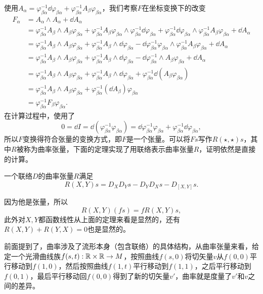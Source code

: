 使用$A_\alpha=\varphi_{\beta\alpha}^{-1}\dd\varphi_{\beta\alpha}+\varphi_{\beta\alpha}^{-1}A_\beta \varphi_{\beta\alpha}$，我们考察$F$在坐标变换下的改变
\begin{align*}
	F_\alpha&=A_\alpha\wedge A_\alpha+\dd A_\alpha\\
	&=\varphi_{\beta\alpha}^{-1}A_\beta \wedge A_\beta \varphi_{\beta\alpha}+ \varphi_{\beta\alpha}^{-1}A_\beta \varphi_{\beta\alpha}\wedge \varphi_{\beta\alpha}^{-1}\dd\varphi_{\beta\alpha}+\varphi_{\beta\alpha}^{-1}\dd\varphi_{\beta\alpha}\wedge \varphi_{\beta\alpha}^{-1}A_\beta \varphi_{\beta\alpha}+\dd A_\alpha\\
	&=\varphi_{\beta\alpha}^{-1}A_\beta \wedge A_\beta \varphi_{\beta\alpha}+ \varphi_{\beta\alpha}^{-1}A_\beta \wedge \dd\varphi_{\beta\alpha}-\dd\varphi_{\beta\alpha}^{-1}\varphi_{\beta\alpha}\wedge \varphi_{\beta\alpha}^{-1}A_\beta \varphi_{\beta\alpha}+\dd A_\alpha\\
	&=\varphi_{\beta\alpha}^{-1}A_\beta \wedge A_\beta \varphi_{\beta\alpha}+ \varphi_{\beta\alpha}^{-1}A_\beta \wedge \dd\varphi_{\beta\alpha}-\dd\varphi_{\beta\alpha}^{-1}\wedge A_\beta \varphi_{\beta\alpha}+\dd A_\alpha\\
	&=\varphi_{\beta\alpha}^{-1}A_\beta \wedge A_\beta \varphi_{\beta\alpha}+ \varphi_{\beta\alpha}^{-1}A_\beta \wedge \dd\varphi_{\beta\alpha}+\varphi_{\beta\alpha}^{-1}\dd \left(A_\beta \varphi_{\beta\alpha}\right)\\
	&=\varphi_{\beta\alpha}^{-1}A_\beta \wedge A_\beta \varphi_{\beta\alpha}+\varphi_{\beta\alpha}^{-1}(\dd A_\beta)\varphi_{\beta\alpha}\\
	&=\varphi_{\beta\alpha}^{-1}F_\beta \varphi_{\beta\alpha}.
\end{align*}
在计算过程中，使用了
\[
	0=\dd I=\dd (\varphi_{\beta\alpha}^{-1}\varphi_{\beta\alpha})=\dd \varphi_{\beta\alpha}^{-1}\varphi_{\beta\alpha}+\varphi_{\beta\alpha}^{-1}\dd\varphi_{\beta\alpha},
\]
所以$F$变换得符合张量的变换方式，即$F$是一个张量。可以将$Fs$写作$R(\star,\star)s$，其中$R$被称为曲率张量，下面的定理实现了用联络表示曲率张量$R$，证明依然是直接的计算。

\para 一个联络$D$的曲率张量$R$满足
	\[
		R(X,Y)s=D_XD_Ys-D_YD_Xs-D_{[X,Y]}s.
	\]

因为他是张量，所以
\[
	R(X,Y)(fs)=fR(X,Y)s,
\]
此外对$X,Y$都函数线性从上面的定理来看是显然的，还有$R(X,Y)+R(Y,X)=0$也是显然的。

前面提到了，曲率涉及了流形本身（包含联络）的具体结构，从曲率张量来看，给定一个光滑曲线族$f(s,t):\mathbb{R}\times \mathbb{R}\to M$，按照曲线$f(s,0)$将切矢量$v$从$f(0,0)$平行移动到$f(1,0)$，然后按照曲线$f(1,t)$平行移动到$f(1,1)$，之后平行移动到$f(0,1)$，最后平行移动回$f(0,0)$得到了新的切矢量$v'$，曲率就是度量了$v'$和$v$之间的差异。

